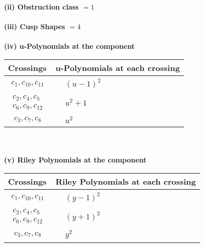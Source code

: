 \documentclass[1p]{elsarticle_modified}
\theoremstyle{definition}
\begin{document}
\flushleft \textbf{(ii) Obstruction class $= 1$}\\~\\
\flushleft \textbf{(iii) Cusp Shapes $= 4$}\\~\\
\newpage\renewcommand{\arraystretch}{1}
\flushleft \textbf{(iv) u-Polynomials at the component}\newline \\
\begin{tabular}{m{50pt}|m{274pt}}
Crossings & \hspace{64pt}u-Polynomials at each crossing \\
\hline $$\begin{aligned}c_{1},c_{10},c_{11}\end{aligned}$$&$\begin{aligned}
&(u-1)^2
\end{aligned}$\\
\hline $$\begin{aligned}c_{2},c_{4},c_{5}\\c_{6},c_{9},c_{12}\end{aligned}$$&$\begin{aligned}
&u^2+1
\end{aligned}$\\
\hline $$\begin{aligned}c_{3},c_{7},c_{8}\end{aligned}$$&$\begin{aligned}
&u^2
\end{aligned}$\\
\hline
\end{tabular}\\~\\
\newpage\renewcommand{\arraystretch}{1}
\flushleft \textbf{(v) Riley Polynomials at the component}\newline \\
\begin{tabular}{m{50pt}|m{274pt}}
Crossings & \hspace{64pt}Riley Polynomials at each crossing \\
\hline $$\begin{aligned}c_{1},c_{10},c_{11}\end{aligned}$$&$\begin{aligned}
&(y-1)^2
\end{aligned}$\\
\hline $$\begin{aligned}c_{2},c_{4},c_{5}\\c_{6},c_{9},c_{12}\end{aligned}$$&$\begin{aligned}
&(y+1)^2
\end{aligned}$\\
\hline $$\begin{aligned}c_{3},c_{7},c_{8}\end{aligned}$$&$\begin{aligned}
&y^2
\end{aligned}$\\
\hline
\end{tabular}\\~\\
\end{document}
